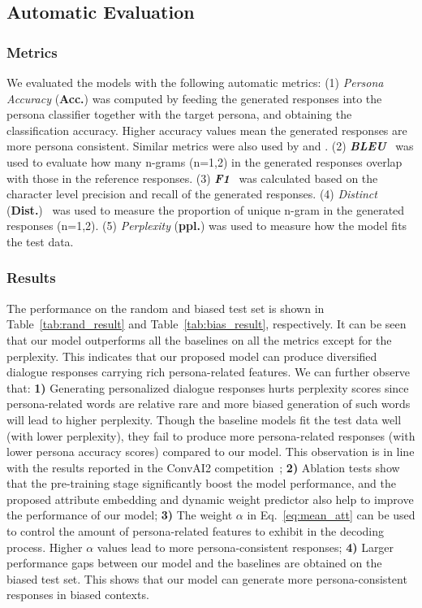 \documentclass[letterpaper]{article} %
\newcommand{\citet}[1]{\citeauthor{#1} \shortcite{#1}}
\newcommand{\citep}{\cite}
\begin{document}
\subsection{Automatic Evaluation}
\subsubsection{Metrics}
We evaluated the models with the following automatic metrics:
(1) \emph{Persona Accuracy} (\textbf{Acc.}) was computed by feeding the generated responses into the persona classifier together with the target persona, and obtaining the classification accuracy. Higher accuracy values mean the generated responses are more persona consistent. Similar metrics were also used by \citet{zheng2019Personal} and \citet{zhou2018emotional}.
(2) \emph{\textbf{BLEU}}~\citep{papineni-etal-2002-bleu} was used to evaluate how many n-grams (n=1,2) in the generated responses overlap with those in the reference responses.
(3) \emph{\textbf{F1}}~\citep{dinan2019convai2} was calculated based on the character level precision and recall of the generated responses.
(4) \emph{Distinct} (\textbf{Dist.})~\citep{li2015diversity} was used to measure the proportion of unique n-gram in the generated responses (n=1,2).
(5) \emph{Perplexity} (\textbf{ppl.}) was used to measure how the model fits the test data.

\subsubsection{Results}
The performance on the random and biased test set is shown in Table~\ref{tab:rand_result} and Table~\ref{tab:bias_result}, respectively. It can be seen that our model outperforms all the baselines on all the metrics except for the perplexity. This indicates that our proposed model can produce diversified dialogue responses carrying rich persona-related features. We can further observe that:
\textbf{1)} Generating personalized dialogue responses hurts perplexity scores since persona-related words are relative rare and more biased generation of such words will lead to higher perplexity. Though the baseline models fit the test data well (with lower perplexity), they fail to produce more persona-related responses (with lower persona accuracy scores) compared to our model. This observation is in line with the results reported in the ConvAI2 competition~\citep{dinan2019convai2};
\textbf{2)} Ablation tests show that the pre-training stage significantly boost the model performance, and the proposed attribute embedding and dynamic weight predictor also help to improve the performance of our model;
\textbf{3)} The weight $\alpha$ in Eq.~\ref{eq:mean_att} can be used to control the amount of persona-related features to exhibit in the decoding process. Higher $\alpha$ values lead to more persona-consistent responses;
\textbf{4)} Larger performance gaps between our model and the baselines are obtained on the biased test set. This shows that our model can generate more persona-consistent responses in biased contexts.
\end{document}
